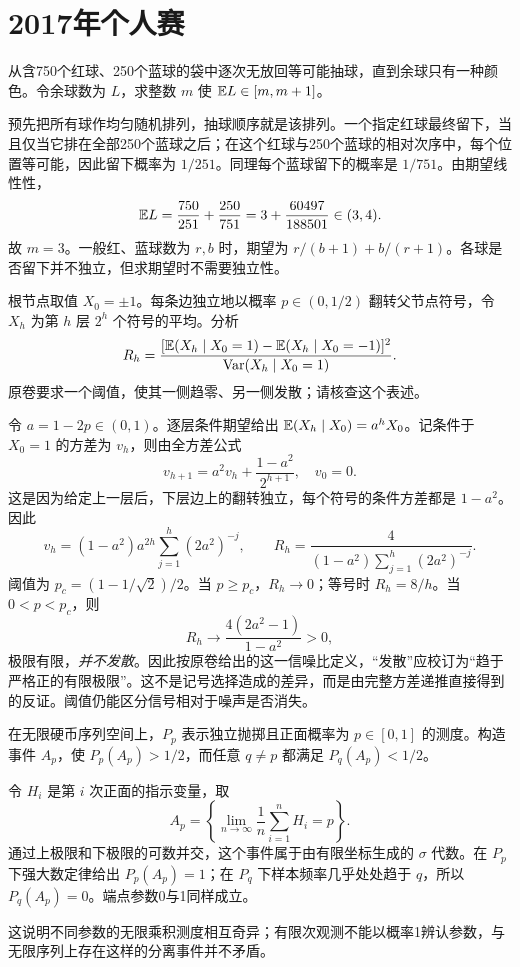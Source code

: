\section{2017年个人赛}
\begin{example}[原题1：抽去球直到仅余一种颜色]\label{yau:2017-1}
从含750个红球、250个蓝球的袋中逐次无放回等可能抽球，直到余球只有一种颜色。令余球数为 $L$，求整数 $m$ 使 $\mathbb E L\in[m,m+1]$。
\end{example}
\begin{solve}
预先把所有球作均匀随机排列，抽球顺序就是该排列。一个指定红球最终留下，当且仅当它排在全部250个蓝球之后；在这个红球与250个蓝球的相对次序中，每个位置等可能，因此留下概率为 $1/251$。同理每个蓝球留下的概率是 $1/751$。由期望线性性，
\[
\mathbb E L=\frac{750}{251}+\frac{250}{751}=3+\frac{60497}{188501}\in(3,4).
\]
故 $m=3$。一般红、蓝球数为 $r,b$ 时，期望为 $r/(b+1)+b/(r+1)$。各球是否留下并不独立，但求期望时不需要独立性。
\end{solve}

\begin{example}[原题2：二叉树信号传播的阈值辨析]\label{yau:2017-2}
根节点取值 $X_0=\pm1$。每条边独立地以概率 $p\in(0,1/2)$ 翻转父节点符号，令 $X_h$ 为第 $h$ 层 $2^h$ 个符号的平均。分析
\[
R_h=\frac{[\mathbb E(X_h\mid X_0=1)-\mathbb E(X_h\mid X_0=-1)]^2}{\operatorname{Var}(X_h\mid X_0=1)}.
\]
原卷要求一个阈值，使其一侧趋零、另一侧发散；请核查这个表述。
\end{example}
\begin{solve}
令 $a=1-2p\in(0,1)$。逐层条件期望给出 $\mathbb E(X_h\mid X_0)=a^hX_0$。记条件于 $X_0=1$ 的方差为 $v_h$，则由全方差公式
\[
v_{h+1}=a^2v_h+\frac{1-a^2}{2^{h+1}},\quad v_0=0.
\]
这是因为给定上一层后，下层边上的翻转独立，每个符号的条件方差都是 $1-a^2$。因此
\[
v_h=(1-a^2)a^{2h}\sum_{j=1}^h(2a^2)^{-j},\qquad
R_h=\frac4{(1-a^2)\sum_{j=1}^h(2a^2)^{-j}}.
\]
阈值为 $p_c=(1-1/\sqrt2)/2$。当 $p\ge p_c$，$R_h\to0$；等号时 $R_h=8/h$。当 $0<p<p_c$，则
\[
R_h\longrightarrow\frac{4(2a^2-1)}{1-a^2}>0,
\]
极限有限，\textit{并不发散}。因此按原卷给出的这一信噪比定义，“发散”应校订为“趋于严格正的有限极限”。这不是记号选择造成的差异，而是由完整方差递推直接得到的反证。阈值仍能区分信号相对于噪声是否消失。
\end{solve}

\begin{example}[原题3：不同硬币参数的无限序列测度]\label{yau:2017-3}
在无限硬币序列空间上，$P_p$ 表示独立抛掷且正面概率为 $p\in[0,1]$ 的测度。构造事件 $A_p$，使 $P_p(A_p)>1/2$，而任意 $q\ne p$ 都满足 $P_q(A_p)<1/2$。
\end{example}
\begin{solve}
令 $H_i$ 是第 $i$ 次正面的指示变量，取
\[
A_p=\left\{\lim_{n\to\infty}\frac1n\sum_{i=1}^nH_i=p\right\}.
\]
通过上极限和下极限的可数并交，这个事件属于由有限坐标生成的 $\sigma$ 代数。在 $P_p$ 下强大数定律给出 $P_p(A_p)=1$；在 $P_q$ 下样本频率几乎处处趋于 $q$，所以 $P_q(A_p)=0$。端点参数0与1同样成立。

这说明不同参数的无限乘积测度相互奇异；有限次观测不能以概率1辨认参数，与无限序列上存在这样的分离事件并不矛盾。
\end{solve}

